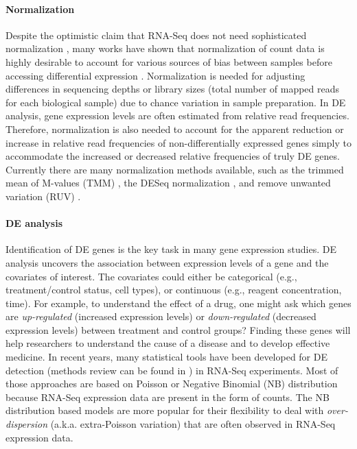 \paragraph*{Normalization}
Despite the optimistic claim that RNA-Seq does not need sophisticated normalization
\citep{wang2009rna}, many works have shown that normalization of count data is highly desirable
 to account for various sources of bias between samples before accessing differential expression
\citep{anders2010differential,dillies2013comprehensive,hansen2012removing, risso2014nat,
	risso2011gc,robinson2010scaling}. Normalization is needed for adjusting differences in sequencing
depths or library sizes (total number of mapped reads for each biological sample) due to chance
variation in sample preparation. In DE analysis, gene expression levels are often estimated from
relative read frequencies. Therefore, normalization is also needed to account for the apparent
reduction or increase in relative read frequencies of non-differentially expressed genes simply to
accommodate the increased or decreased relative frequencies of truly DE genes. Currently there are
many normalization methods available, such as the trimmed mean of M-values (TMM) 
\citep{robinson2010scaling},
the DESeq normalization \citep{anders2010differential}, and remove unwanted variation (RUV)
\citep{risso2014nat}. 

\paragraph*{DE analysis}
Identification of DE genes is the key task in many gene expression studies. DE analysis uncovers the
association between expression levels of a gene and the covariates of interest. The covariates 
could either be
categorical (e.g., treatment/control status, cell types), or continuous (e.g., reagent
concentration, time). For example, to understand the effect of a drug, one might ask which genes are
\textit{up-regulated} (increased expression levels) or \textit{down-regulated} (decreased expression levels)
between treatment and control groups? Finding these genes will help researchers to understand the
cause of a disease and to develop effective medicine. In recent years, many statistical tools have 
been developed for DE detection (methods review can be found in 
\cite{rapaport2013comprehensive,seyednasrollah2015comparison,soneson2013comparison}) in RNA-Seq 
experiments. 
Most of those approaches are based on Poisson \citep{marioni2008rna, wang2010degseq}
or Negative Binomial (NB) distribution
\citep{anders2010differential,di2011nbp,oberg2012technical,robinson2007moderated, wu2013new} because
RNA-Seq expression data are present in the form of counts. %
The NB distribution based models are more popular for their flexibility to deal with 
\textit{over-dispersion} (a.k.a. extra-Poisson variation) that are often observed in RNA-Seq expression data.



